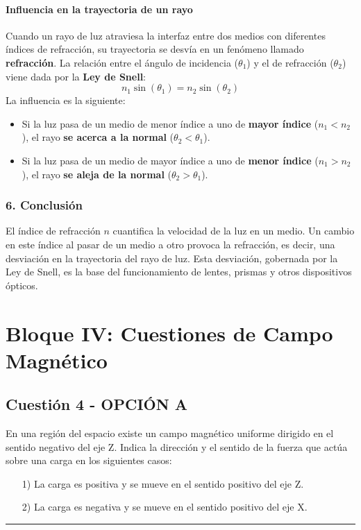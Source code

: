 \paragraph{Influencia en la trayectoria de un rayo}
Cuando un rayo de luz atraviesa la interfaz entre dos medios con diferentes índices de refracción, su trayectoria se desvía en un fenómeno llamado \textbf{refracción}. La relación entre el ángulo de incidencia ($\theta_1$) y el de refracción ($\theta_2$) viene dada por la \textbf{Ley de Snell}:
$$ n_1 \sin(\theta_1) = n_2 \sin(\theta_2) $$
La influencia es la siguiente:
\begin{itemize}
    \item Si la luz pasa de un medio de menor índice a uno de \textbf{mayor índice} ($n_1 < n_2$), el rayo \textbf{se acerca a la normal} ($\theta_2 < \theta_1$).
    \item Si la luz pasa de un medio de mayor índice a uno de \textbf{menor índice} ($n_1 > n_2$), el rayo \textbf{se aleja de la normal} ($\theta_2 > \theta_1$).
\end{itemize}

\subsubsection*{6. Conclusión}
\begin{cajaconclusion}
El índice de refracción $n$ cuantifica la velocidad de la luz en un medio. Un cambio en este índice al pasar de un medio a otro provoca la refracción, es decir, una desviación en la trayectoria del rayo de luz. Esta desviación, gobernada por la Ley de Snell, es la base del funcionamiento de lentes, prismas y otros dispositivos ópticos.
\end{cajaconclusion}

\newpage

\section{Bloque IV: Cuestiones de Campo Magnético}
\label{sec:em_2009_jun_ord}

\subsection{Cuestión 4 - OPCIÓN A}
\label{subsec:4A_2009_jun_ord}

\begin{cajaenunciado}
En una región del espacio existe un campo magnético uniforme dirigido en el sentido negativo del eje Z. Indica la dirección y el sentido de la fuerza que actúa sobre una carga en los siguientes casos:
\begin{enumerate}
    \item[1)] La carga es positiva y se mueve en el sentido positivo del eje Z.
    \item[2)] La carga es negativa y se mueve en el sentido positivo del eje X.
\end{enumerate}
\end{cajaenunciado}
\hrule


